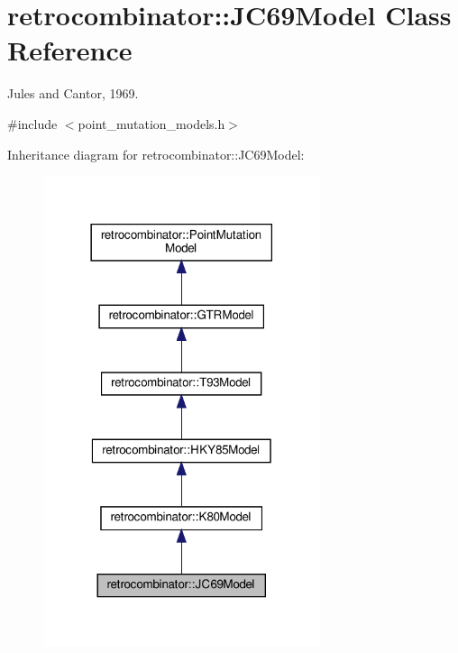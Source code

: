 \hypertarget{classretrocombinator_1_1JC69Model}{}\section{retrocombinator\+:\+:J\+C69\+Model Class Reference}
\label{classretrocombinator_1_1JC69Model}


Jules and Cantor, 1969.  




{\ttfamily \#include $<$point\+\_\+mutation\+\_\+models.\+h$>$}



Inheritance diagram for retrocombinator\+:\+:J\+C69\+Model\+:
\nopagebreak
\begin{figure}[H]
\begin{center}
\leavevmode
\includegraphics[width=230pt]{classretrocombinator_1_1JC69Model__inherit__graph}
\end{center}
\end{figure}


